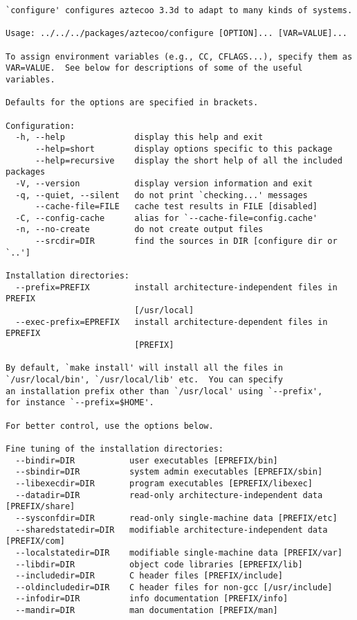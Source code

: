 \begin{Verbatim}
`configure' configures aztecoo 3.3d to adapt to many kinds of systems.

Usage: ../../../packages/aztecoo/configure [OPTION]... [VAR=VALUE]...

To assign environment variables (e.g., CC, CFLAGS...), specify them as
VAR=VALUE.  See below for descriptions of some of the useful variables.

Defaults for the options are specified in brackets.

Configuration:
  -h, --help              display this help and exit
      --help=short        display options specific to this package
      --help=recursive    display the short help of all the included packages
  -V, --version           display version information and exit
  -q, --quiet, --silent   do not print `checking...' messages
      --cache-file=FILE   cache test results in FILE [disabled]
  -C, --config-cache      alias for `--cache-file=config.cache'
  -n, --no-create         do not create output files
      --srcdir=DIR        find the sources in DIR [configure dir or `..']

Installation directories:
  --prefix=PREFIX         install architecture-independent files in PREFIX
                          [/usr/local]
  --exec-prefix=EPREFIX   install architecture-dependent files in EPREFIX
                          [PREFIX]

By default, `make install' will install all the files in
`/usr/local/bin', `/usr/local/lib' etc.  You can specify
an installation prefix other than `/usr/local' using `--prefix',
for instance `--prefix=$HOME'.

For better control, use the options below.

Fine tuning of the installation directories:
  --bindir=DIR           user executables [EPREFIX/bin]
  --sbindir=DIR          system admin executables [EPREFIX/sbin]
  --libexecdir=DIR       program executables [EPREFIX/libexec]
  --datadir=DIR          read-only architecture-independent data [PREFIX/share]
  --sysconfdir=DIR       read-only single-machine data [PREFIX/etc]
  --sharedstatedir=DIR   modifiable architecture-independent data [PREFIX/com]
  --localstatedir=DIR    modifiable single-machine data [PREFIX/var]
  --libdir=DIR           object code libraries [EPREFIX/lib]
  --includedir=DIR       C header files [PREFIX/include]
  --oldincludedir=DIR    C header files for non-gcc [/usr/include]
  --infodir=DIR          info documentation [PREFIX/info]
  --mandir=DIR           man documentation [PREFIX/man]


\end{Verbatim}
